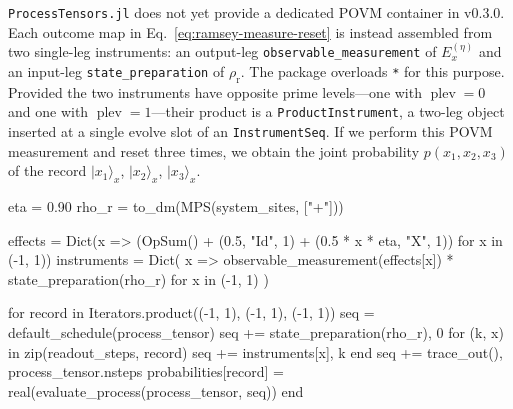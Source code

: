 \texttt{ProcessTensors.jl} does not yet provide a dedicated POVM container in v0.3.0. 
Each outcome map in Eq.~\eqref{eq:ramsey-measure-reset} is instead assembled from two single-leg instruments: an output-leg \texttt{observable\_measurement} of \(E_x^{(\eta)}\) and an input-leg \texttt{state\_preparation} of \(\rho_{\mathrm r}\). 
The package overloads \texttt{*} for this purpose. 
Provided the two instruments have opposite prime levels---one with \(\operatorname{plev}=0\) and one with \(\operatorname{plev}=1\)---their product is a \texttt{ProductInstrument}, a two-leg object inserted at a single evolve slot of an \texttt{InstrumentSeq}. 
If we perform this POVM measurement and reset three times, we obtain the joint probability \(p(x_1,x_2,x_3)\) of the record \(\lvert x_1\rangle_x\), \(\lvert x_2\rangle_x\), \(\lvert x_3\rangle_x\).
%
\begin{juliacode}[
    caption={POVM-and-reset \texttt{ProductInstrument}s for three Ramsey readouts.},
    label={lst:workflow-ramsey},
]
eta = 0.90
rho_r = to_dm(MPS(system_sites, ["+"]))

effects = Dict(x => (OpSum() + (0.5, "Id", 1) + (0.5 * x * eta, "X", 1)) for x in (-1, 1))
instruments = Dict(
    x => observable_measurement(effects[x]) * state_preparation(rho_r)
    for x in (-1, 1)
)

for record in Iterators.product((-1, 1), (-1, 1), (-1, 1))
    seq = default_schedule(process_tensor)
    seq += state_preparation(rho_r), 0
    for (k, x) in zip(readout_steps, record)
        seq += instruments[x], k
    end
    seq += trace_out(), process_tensor.nsteps
    probabilities[record] = real(evaluate_process(process_tensor, seq))
end
\end{juliacode}
%

